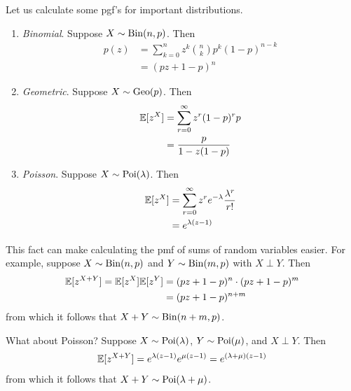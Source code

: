 \documentclass{../../template/note}
\begin{document}
    \begin{example*}
        Let us calculate some pgf's for important distributions.
        \begin{enumerate}[label=\protect\circled{\arabic*}]
            \item \emph{Binomial}. Suppose \(X \sim \operatorname{Bin}(n, p)\). Then
            \begin{align*}
                p(z) &= \sum_{k=0}^n z^k \binom n k p^k (1-p)^{n-k} \\
                &= (pz + 1-p)^n
            \end{align*}
            \item \emph{Geometric}. Suppose \(X \sim \operatorname{Geo}(p)\). Then
            \begin{align*}
                \mathbb E[z^X] &= \sum_{r=0}^\infty z^r (1-p)^r p \\
                &= \frac p {1-z(1-p)}
            \end{align*}
            \item \emph{Poisson}. Suppose \(X \sim \operatorname{Poi}(\lambda)\). Then
            \begin{align*}
                \mathbb E[z^X] &= \sum_{r=0}^\infty z^r e^{-\lambda} \frac{\lambda^r}{r!} \\
                &= e^{\lambda(z-1)}
            \end{align*}
        \end{enumerate}
    \end{example*}
    
    \begin{example*}
        This fact can make calculating the pmf of sums of random variables easier. For example, suppose \(X \sim \operatorname{Bin}(n, p)\) and \(Y \sim \operatorname{Bin}(m, p)\) with \(X \perp Y\). Then
        \begin{align*}
            \mathbb E[z^{X+Y}] = \mathbb E[z^X] \mathbb E[z^Y] &= (pz+1-p)^n \cdot (pz+1-p)^m \\
            &= (pz+1-p)^{n+m}
        \end{align*}
        from which it follows that \(X + Y \sim \operatorname{Bin}(n + m, p)\).

        What about Poisson? Suppose \(X \sim \operatorname{Poi}(\lambda)\), \(Y \sim \operatorname{Poi}(\mu)\), and \(X \perp Y\). Then
        \begin{align*}
            \mathbb E[z^{X+Y}] = e^{\lambda(z-1)}e^{\mu(z-1)} = e^{(\lambda+\mu)(z-1)}
        \end{align*}
        from which it follows that \(X + Y \sim \operatorname{Poi}(\lambda + \mu)\).
    \end{example*}
\end{document}
